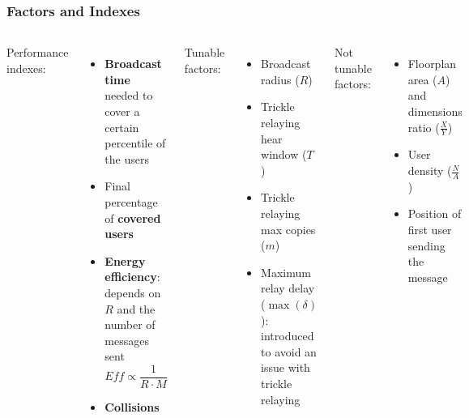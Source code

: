 \documentclass{beamer}
\begin{document}
\begin{frame}
	\frametitle{Factors and Indexes}
	\begin{columns}
		Performance indexes:
		\begin{itemize}
			\item \textbf{Broadcast time} needed to cover a certain
				percentile of the users
			\item Final percentage of \textbf{covered users}
			\item \textbf{Energy efficiency}: depends on \(R\) and
				the number of messages sent
				\[\mathit{Eff} \propto \frac{1}{R \cdot M}\]
			\item \textbf{Collisions}
		\end{itemize}
		Tunable factors:
		\begin{itemize}
			\item Broadcast radius (\(R\))
			\item Trickle relaying hear window (\(T\))
			\item Trickle relaying max copies (\(m\))
			\item Maximum relay delay (\(\max(\delta)\)): introduced
				to avoid an issue with trickle relaying
		\end{itemize}
		Not tunable factors:
		\begin{itemize}
			\item Floorplan area (\(A\)) and dimensions ratio
				(\(\frac{X}{Y}\))
			\item User density (\(\frac{N}{A}\))
			\item Position of first user sending the message
		\end{itemize}
	\end{columns}
\end{frame}
\end{document}
